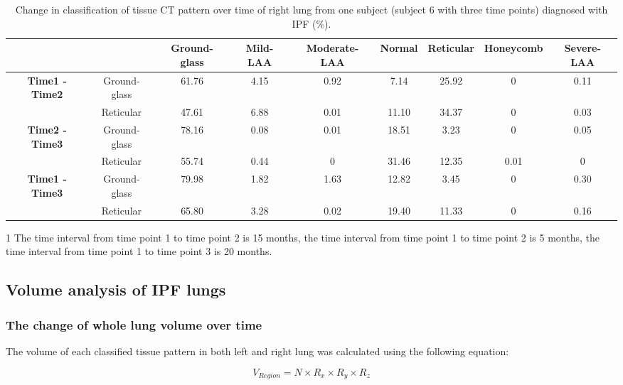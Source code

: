 \begin{landscape}
\begin{table}[p]
\centering
\caption{Change in classification of tissue CT pattern over time of right lung from one subject (subject 6 with three time points) diagnosed with IPF (\%).}
\label{tab:ChangeOverTimeRight}
\begin{tabular}{c c c c c c c c c}
\hline
\quad & \quad & \bf{Ground-glass} &	\bf{Mild-LAA} &	\bf{Moderate-LAA} &	\bf{Normal} &	\bf{Reticular} &	\bf{Honeycomb} &	\bf{Severe-LAA}\\
\hline
\bf{Time1 - Time2} &	Ground-glass &	61.76 &	4.15 &	0.92 &	7.14 &	25.92 &	0 &	0.11\\
\quad & Reticular	& 47.61 &	6.88 &	0.01 &	11.10 &	34.37 &	0 &	0.03\\
\hline
\bf{Time2 - Time3} &	Ground-glass &	78.16 &	0.08 &	0.01 &	18.51 &	3.23 &	0 &	0.05\\
\quad & Reticular &	55.74 &	0.44 &	0 &	31.46 &	12.35 &	0.01 &	0\\
\hline
\bf{Time1 - Time3} &	Ground-glass &	79.98 &	1.82 &	1.63 &	12.82 &	3.45 &	0 &	0.30\\
\quad & Reticular &	65.80 &	3.28 &	0.02 &	19.40 &	11.33 &	0 &	0.16\\
\hline
\end{tabular}
\begin{tablenotes}
  \item[1] The time interval from time point 1 to time point 2 is 15 months, the time interval from time point 1 to time point 2 is 5 months, the time interval from time point 1 to time point 3 is 20 months.
\end{tablenotes}
\end{table}
\end{landscape}
\restoregeometry %

\subsection{Volume analysis of IPF lungs} \label{VolumeAnalysis}
\subsubsection{The change of whole lung volume over time}
The volume of each classified tissue pattern in both left and right lung was calculated using the following equation:

\begin{equation}
V_{Region} = N \times R_x \times R_y \times R_z
\end{equation}

